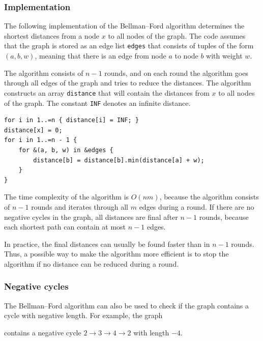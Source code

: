 \subsubsection{Implementation}

The following implementation of the
Bellman–Ford algorithm determines the shortest distances
from a node $x$ to all nodes of the graph.
The code assumes that the graph is stored
as an edge list \texttt{edges}
that consists of tuples of the form $(a,b,w)$,
meaning that there is an edge from node $a$ to node $b$
with weight $w$.

The algorithm consists of $n-1$ rounds,
and on each round the algorithm goes through
all edges of the graph and tries to
reduce the distances.
The algorithm constructs an array \texttt{distance}
that will contain the distances from $x$
to all nodes of the graph.
The constant \texttt{INF} denotes an infinite distance.

\begin{lstlisting}
for i in 1..=n { distance[i] = INF; }
distance[x] = 0;
for i in 1..=n - 1 {
    for &(a, b, w) in &edges {
        distance[b] = distance[b].min(distance[a] + w);
    }
}
\end{lstlisting}

The time complexity of the algorithm is $O(nm)$,
because the algorithm consists of $n-1$ rounds and
iterates through all $m$ edges during a round.
If there are no negative cycles in the graph,
all distances are final after $n-1$ rounds,
because each shortest path can contain at most $n-1$ edges.

In practice, the final distances can usually
be found faster than in $n-1$ rounds.
Thus, a possible way to make the algorithm more efficient
is to stop the algorithm if no distance
can be reduced during a round.

\subsubsection{Negative cycles}


The Bellman–Ford algorithm can also be used to
check if the graph contains a cycle with negative length.
For example, the graph

\begin{center}
\end{center}
\noindent
contains a negative cycle
$2 \rightarrow 3 \rightarrow 4 \rightarrow 2$
with length $-4$.

